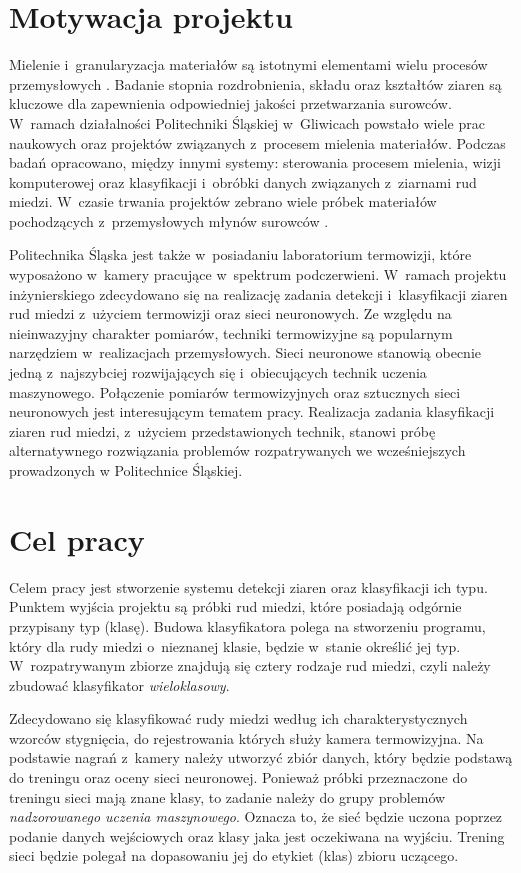 \section{Motywacja projektu}
Mielenie i~granularyzacja materiałów są istotnymi elementami wielu procesów
przemysłowych \cite{budzan_grains}.
Badanie stopnia rozdrobnienia, składu oraz kształtów ziaren są kluczowe dla
zapewnienia odpowiedniej jakości przetwarzania surowców.
W~ramach działalności Politechniki Śląskiej w~Gliwicach powstało wiele prac
naukowych oraz projektów związanych z~procesem mielenia materiałów.
Podczas badań opracowano, między innymi systemy: sterowania procesem mielenia,
wizji komputerowej oraz klasyfikacji i~obróbki danych związanych z~ziarnami rud
miedzi.
W~czasie trwania projektów zebrano wiele próbek materiałów pochodzących
z~przemysłowych młynów surowców \cite{budzan_grains, krauze_milling}.

Politechnika Śląska jest także w~posiadaniu laboratorium termowizji, które
wyposażono w~kamery pracujące w~spektrum podczerwieni.
W~ramach projektu inżynierskiego zdecydowano się na realizację zadania detekcji
i~klasyfikacji ziaren rud miedzi z~użyciem termowizji oraz sieci neuronowych.
Ze względu na nieinwazyjny charakter pomiarów, techniki termowizyjne są
popularnym narzędziem w~realizacjach przemysłowych.
Sieci neuronowe stanowią obecnie jedną z~najszybciej rozwijających się
i~obiecujących technik uczenia maszynowego.
Połączenie pomiarów termowizyjnych oraz sztucznych sieci neuronowych jest
interesującym tematem pracy.
Realizacja zadania klasyfikacji ziaren rud miedzi, z~użyciem przedstawionych
technik, stanowi próbę alternatywnego rozwiązania problemów rozpatrywanych we
wcześniejszych prowadzonych w Politechnice Śląskiej.

\section{Cel pracy}
Celem pracy jest stworzenie systemu detekcji ziaren oraz klasyfikacji ich typu.
Punktem wyjścia projektu są próbki rud miedzi, które posiadają odgórnie
przypisany typ (klasę).
Budowa klasyfikatora polega na stworzeniu programu, który dla rudy miedzi
o~nieznanej klasie, będzie w~stanie określić jej typ.
W~rozpatrywanym zbiorze znajdują się cztery rodzaje rud miedzi, czyli należy
zbudować klasyfikator \emph{wieloklasowy}.

Zdecydowano się klasyfikować rudy miedzi według ich charakterystycznych wzorców
stygnięcia, do rejestrowania których służy kamera termowizyjna.
Na podstawie nagrań z~kamery należy utworzyć zbiór danych, który będzie podstawą
do treningu oraz oceny sieci neuronowej.
Ponieważ próbki przeznaczone do treningu sieci mają znane klasy, to zadanie
należy do grupy problemów \emph{nadzorowanego uczenia maszynowego}.
Oznacza to, że sieć będzie uczona poprzez podanie danych wejściowych oraz klasy
jaka jest oczekiwana na wyjściu.
Trening sieci będzie polegał na dopasowaniu jej do etykiet (klas) zbioru
uczącego.

